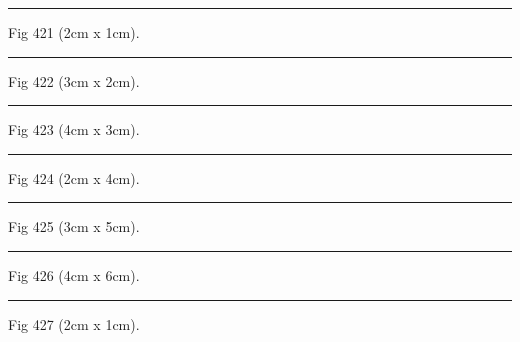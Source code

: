 \documentclass[a4paper,11pt]{article}
\begin{document}
\begin{swarmwrap}%
  \begin{minipage}[t]{2cm}
    \centering
    \rule{\linewidth}{1cm}
    {\footnotesize Fig 421 (2cm x 1cm).}
  \end{minipage}%
\end{swarmwrap}%
\swarmwrapnext
\lipsum[121]%

\begin{swarmwrap}%
  \begin{minipage}[t]{3cm}
    \centering
    \rule{\linewidth}{2cm}
    {\footnotesize Fig 422 (3cm x 2cm).}
  \end{minipage}%
\end{swarmwrap}%
\swarmwrapnext
\lipsum[122]%

\begin{swarmwrap}%
  \begin{minipage}[t]{4cm}
    \centering
    \rule{\linewidth}{3cm}
    {\footnotesize Fig 423 (4cm x 3cm).}
  \end{minipage}%
\end{swarmwrap}%
\swarmwrapnext
\lipsum[123]%

\begin{swarmwrap}%
  \begin{minipage}[t]{2cm}
    \centering
    \rule{\linewidth}{4cm}
    {\footnotesize Fig 424 (2cm x 4cm).}
  \end{minipage}%
\end{swarmwrap}%
\swarmwrapnext
\lipsum[124]%

\begin{swarmwrap}%
  \begin{minipage}[t]{3cm}
    \centering
    \rule{\linewidth}{5cm}
    {\footnotesize Fig 425 (3cm x 5cm).}
  \end{minipage}%
\end{swarmwrap}%
\swarmwrapnext
\lipsum[125]%

\begin{swarmwrap}%
  \begin{minipage}[t]{4cm}
    \centering
    \rule{\linewidth}{6cm}
    {\footnotesize Fig 426 (4cm x 6cm).}
  \end{minipage}%
\end{swarmwrap}%
\swarmwrapnext
\lipsum[126]%

\begin{swarmwrap}%
  \begin{minipage}[t]{2cm}
    \centering
    \rule{\linewidth}{1cm}
    {\footnotesize Fig 427 (2cm x 1cm).}
  \end{minipage}%
\end{swarmwrap}%
\swarmwrapnext
\lipsum[127]%
\end{document}
